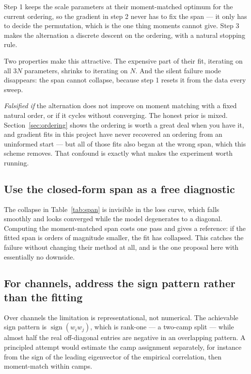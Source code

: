 \documentclass[11pt,a4paper]{article}
\begin{document}
Step 1 keeps the scale parameters at their moment-matched optimum for the current ordering, so
the gradient in step 2 never has to fix the span --- it only has to decide the permutation,
which is the one thing moments cannot give. Step 3 makes the alternation a discrete descent on
the ordering, with a natural stopping rule.

Two properties make this attractive. The expensive part of their fit, iterating on all $3N$
parameters, shrinks to iterating on $N$. And the silent failure mode disappears: the span
cannot collapse, because step 1 resets it from the data every sweep.

\emph{Falsified if} the alternation does not improve on moment matching with a fixed natural
order, or if it cycles without converging. The honest prior is mixed. Section~\ref{sec:ordering}
shows the ordering is worth a great deal when you have it, and gradient fits in this project
have never recovered an ordering from an uninformed start --- but all of those fits also began
at the wrong span, which this scheme removes. That confound is exactly what makes the
experiment worth running.

\subsection{Use the closed-form span as a free diagnostic}

The collapse in Table~\ref{tab:span} is invisible in the loss curve, which falls smoothly and
looks converged while the model degenerates to a diagonal. Computing the moment-matched span
costs one pass and gives a reference: if the fitted span is orders of magnitude smaller, the
fit has collapsed. This catches the failure without changing their method at all, and is the
one proposal here with essentially no downside.

\subsection{For channels, address the sign pattern rather than the fitting}

Over channels the limitation is representational, not numerical. The achievable sign pattern is
$\operatorname{sign}(w_i w_j)$, which is rank-one --- a two-camp split --- while almost half the
real off-diagonal entries are negative in an overlapping pattern. A principled attempt would
estimate the camp assignment separately, for instance from the sign of the leading eigenvector
of the empirical correlation, then moment-match within camps.
\end{document}
